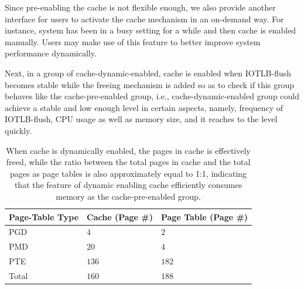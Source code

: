 Since pre-enabling the cache is not flexible enough, we also provide another interface for users to activate the cache mechanism in an on-demand way. For instance, system has been in a busy setting for a while and then cache is enabled manually. Users may make use of this feature to better improve system performance dynamically.

Next, in a group of cache-dynamic-enabled, cache is enabled when IOTLB-flush becomes stable while the freeing mechanism is added so as to check if this group behaves like the cache-pre-enabled group, i.e., cache-dynamic-enabled group could achieve a stable and low enough level in certain aspects, namely, frequency of IOTLB-flush, CPU usage as well as memory size, and it reaches to the level quickly.


\begin{table}[!ht]
\footnotesize
\begin{center}
\begin{tabular}{|l|l|l|}
\hline
{\textbf{Page-Table Type}} & {\textbf{Cache (Page \#)}} & {\textbf{Page Table (Page \#)}} \\ \hline
PGD & $4$  & $2$ \\ \hline
PMD & $20$ & $4$  \\ \hline
PTE & $136$ & $182$ \\ \hline
Total & $160$ & $188$ \\ \hline
\end{tabular}
\end{center}
\caption{When cache is dynamically enabled, the pages in cache is effectively freed, while the ratio between the total pages in cache and the total pages as page tables is also approximately equal to 1:1, indicating that the feature of dynamic enabling cache efficiently consumes memory as the cache-pre-enabled group.}
\label{tab:dynPGpool}
\end{table}

